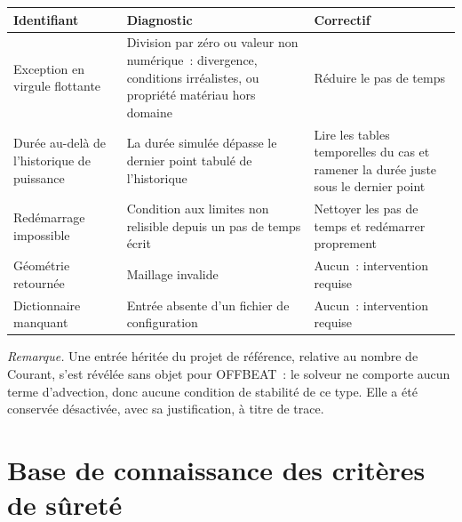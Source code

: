 \documentclass[12pt,a4paper,french]{report}
\begin{document}
\vspace{0.3cm}
\noindent
\begin{tabularx}{\textwidth}{@{}>{\raggedright\arraybackslash}p{3.4cm}XX@{}}
\toprule
\textbf{Identifiant} & \textbf{Diagnostic} & \textbf{Correctif}\\
\midrule
Exception en virgule flottante & Division par zéro ou valeur non numérique~:
  divergence, conditions irréalistes, ou propriété matériau hors domaine
  & Réduire le pas de temps\\
Durée au-delà de l'historique de puissance & La durée simulée dépasse le
  dernier point tabulé de l'historique & Lire les tables temporelles du cas et
  ramener la durée juste sous le dernier point\\
Redémarrage impossible & Condition aux limites non relisible depuis un pas de
  temps écrit & Nettoyer les pas de temps et redémarrer proprement\\
Géométrie retournée & Maillage invalide & Aucun~: intervention requise\\
Dictionnaire manquant & Entrée absente d'un fichier de configuration &
  Aucun~: intervention requise\\
\bottomrule
\end{tabularx}

\vspace{0.4cm}
\noindent\textit{Remarque.} Une entrée héritée du projet de référence, relative
au nombre de Courant, s'est révélée sans objet pour OFFBEAT~: le solveur ne
comporte aucun terme d'advection, donc aucune condition de stabilité de ce type.
Elle a été conservée désactivée, avec sa justification, à titre de trace.

\section{Base de connaissance des critères de sûreté}
\label{ann:safetykb}
\end{document}
